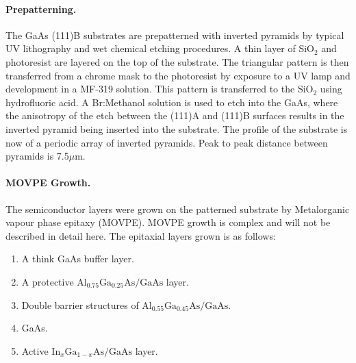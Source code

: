 \documentclass[12pt, twoside]{article}
\numberwithin{equation}{section}
\begin{document}
\paragraph{Prepatterning.}\label{prepatterning.}

The GaAs (111)B substrates are prepatterned with inverted pyramids by
typical UV lithography and wet chemical etching procedures. A thin layer
of SiO$_2$ and photoresist are layered on the top of the substrate. The
triangular pattern is then transferred from a chrome mask to the
photoresist by exposure to a UV lamp and development in a MF-319
solution. This pattern is transferred to the SiO$_2$ using hydrofluoric
acid. A Br:Methanol solution is used to etch into the GaAs, where the
anisotropy of the etch between the (111)A and (111)B surfaces results in
the inverted pyramid being inserted into the substrate. The profile of
the substrate is now of a periodic array of inverted pyramids. Peak to
peak distance between pyramids is 7.5$\mu$m.

\paragraph{MOVPE Growth.}\label{movpe-growth.}

The semiconductor layers were grown on the patterned substrate by
Metalorganic vapour phase epitaxy (MOVPE). MOVPE growth is complex and
will not be described in detail here. The epitaxial layers grown is as
follows:

\begin{enumerate}
\def\labelenumi{\arabic{enumi}.}
\itemsep1pt\parskip0pt
\item
  A think GaAs buffer layer.
\item
  A protective $\text{Al}_{0.75}\text{Ga}_{0.25}\text{As/GaAs}$ layer.
\item
  Double barrier structures of
  $\text{Al}_{0.55}\text{Ga}_{0.45}\text{As/GaAs}$.
\item
  GaAs.
\item
  Active $\text{In}_x\text{Ga}_{1-x}\text{As/GaAs}$ layer.
\end{enumerate}
\end{document}
